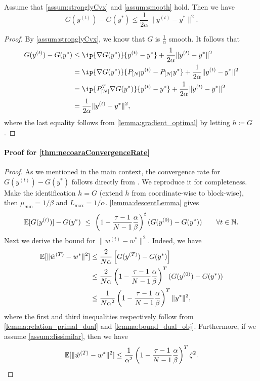 \begin{lemma} \label{lemma:bound_dual_obj}
    Assume that \autoref{assum:stronglyCvx} and \autoref{assum:smooth} hold. Then we have 
    \[G(y^{(t)}) - G(y^*) \leq \frac{1}{2\alpha}\|y^{(t)} - y^*\|^2.\]
\end{lemma}
\begin{proof}
    By \autoref{assum:stronglyCvx}, we know that $G$ is $\frac{1}{\alpha}$ smooth. It follows that 
    \begin{align*}
        G(y^{(t)}) - G(y^*) &\leq \ip{\nabla G(y^*)}{y^{(t)} - y^*} + \frac{1}{2\alpha}\|y^{(t)} - y^*\|^2 
        \\&= \ip{\nabla G(y^*)}{P_{[N]}y^{(t)} - P_{[N]}y^*} + \frac{1}{2\alpha}\|y^{(t)} - y^*\|^2
        \\&= \ip{ P_{[N]}^T \nabla G(y^*)}{y^{(t)} - y^*} + \frac{1}{2\alpha}\|y^{(t)} - y^*\|^2
        \\&= \frac{1}{2\alpha}\|y^{(t)} - y^*\|^2,
    \end{align*}
    where the last equality follows from \autoref{lemma:gradient_optimal} by letting $h \coloneqq G$. 
\end{proof}

\paragraph{Proof for \autoref{thm:necoaraConvergenceRate} }
\begin{proof}
    As we mentioned in the main context, the convergence rate for $G(y^{(t)}) - G(y^*)$ follows directly from \citep{necoara2017random}. We reproduce it for completeness.
    Make the identification $h = G$ (extend $h$ from coordinate-wise to block-wise), then $\mu_{\min} = 1/\beta$ and $L_{\max} = 1/\alpha$. \autoref{lemma:descentLemma} gives
    \begin{align*}
        \mathbb{E} [G( y^{(t)} )] - G(y^*) ~\leq~ \left( 1 - \frac{\tau-1}{N-1} \frac{\alpha}{\beta}  \right)^t ( G( y^{(0)} ) - G(y^*) ) \qquad \forall t \in \mathbb{N}. 
    \end{align*}
    Next we derive the bound for $\|w^{(t)} - w^*\|^2$. Indeed, we have
    \begin{align*}
        \mathbb{E}[\|\hat w^{(T)} - w^*\|^2] &\leq \frac{2}{N \alpha}\left[G(y^{(T)}) - G(y^*) \right]
        \\&\leq \frac{2}{N \alpha} \left( 1 - \frac{\tau - 1}{N-1} \frac{\alpha}{\beta} \right)^{T} ( G(y^{(0)}) - G(y^*) )
        \\&\leq \frac{1}{N \alpha^2} \left( 1 - \frac{\tau - 1}{N-1} \frac{\alpha}{\beta} \right)^{T} \|y^*\|^2,
    \end{align*}
    where the first and third inequalities respectively follow from \autoref{lemma:relation_primal_dual} and \autoref{lemma:bound_dual_obj}. 
    Furthermore, if we assume \autoref{assum:dissimilar}, then we have 
    \[\mathbb{E}[\|\hat w^{(T)} - w^*\|^2] \leq \frac{1}{\alpha^2} \left( 1 - \frac{\tau - 1}{N-1} \frac{\alpha}{\beta} \right)^{T} \zeta^2.\]
\end{proof}


